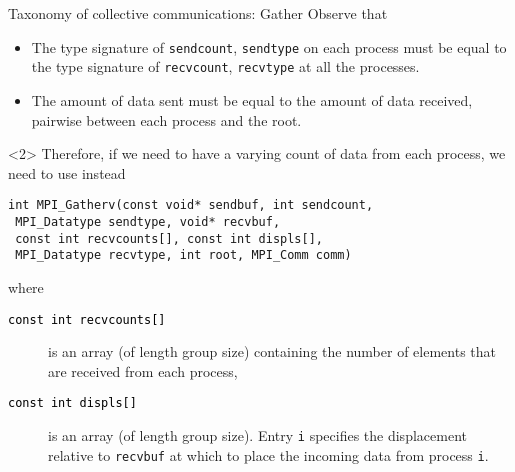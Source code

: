 \documentclass[xcolor={svgnames,usenames}]{beamer}
\begin{document}
\begin{frame}[fragile]{Taxonomy of collective communications: Gather}
\small
Observe that
\begin{itemize}
	\item The type signature of \texttt{sendcount}, \texttt{sendtype} on each process must be equal to the type signature of \texttt{recvcount}, \texttt{recvtype} at all the processes. 
	\item The amount of data sent must be equal to the amount of data received, pairwise between each process and the root.
\end{itemize}
\begin{onlyenv}<2>
	Therefore, if we need to have a varying count of data from each process, we need to use instead 
\begin{verbatim}
int MPI_Gatherv(const void* sendbuf, int sendcount, 
 MPI_Datatype sendtype, void* recvbuf, 
 const int recvcounts[], const int displs[], 
 MPI_Datatype recvtype, int root, MPI_Comm comm)
\end{verbatim}
	where
	\begin{description}
		\item[\textcolor{black}{\texttt{const int recvcounts[]}}] is an array (of length group size) containing the number of elements that are received from each process,
		\item[\textcolor{black}{\texttt{const int displs[]}}] is an array (of length group size). Entry \texttt{i} specifies
		the displacement relative to \texttt{recvbuf} at which to place the incoming data from process \texttt{i}.
	\end{description}
\end{onlyenv}
\end{frame}
\end{document}
